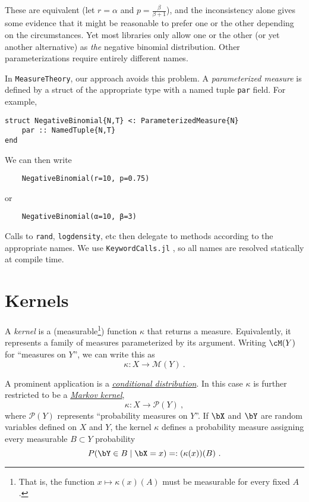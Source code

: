 \documentclass{juliacon}
\begin{document}
These are equivalent (let $r = \alpha$ and $p = \frac{\beta}{\beta + 1}$), and the inconsistency alone gives some evidence that it might be reasonable to prefer one or the other depending on the circumstances. Yet most libraries only allow one or the other (or yet another alternative) as \emph{the} negative binomial distribution. Other parameterizations require entirely different names.

In \verb|MeasureTheory|, our approach avoids this problem. A \emph{parameterized measure} is defined by a struct of the appropriate type with a named tuple \verb|par| field. For example,

\begin{verbatim}
struct NegativeBinomial{N,T} <: ParameterizedMeasure{N}
    par :: NamedTuple{N,T}
end
\end{verbatim}

We can then write 
\begin{verbatim}
    NegativeBinomial(r=10, p=0.75)
\end{verbatim}
or
\begin{verbatim}
    NegativeBinomial(α=10, β=3)
\end{verbatim}

Calls to \verb|rand|, \verb|logdensity|, etc then delegate to methods according to the appropriate names. We use \verb|KeywordCalls.jl| \cite{KeywordCalls.jl}, so all names are resolved statically at compile time.

\section{Kernels}

A \emph{kernel} is a (measurable\footnote{That is, the function $x \mapsto \kappa(x)(A)$ must be measurable for every fixed $A$.}) function $\kappa$ that returns a measure. Equivalently, it represents a family of measures parameterized by its argument. Writing $\cM(Y)$ for ``measures on $Y$'', we can write this as
\[
\kappa\colon X \to \mathscr{M}(Y)\ .
\]

A prominent application is a \href{https://en.wikipedia.org/wiki/Conditional_probability_distribution}{\emph{conditional distribution}}. In this case $\kappa$ is further restricted to be a \href{https://en.wikipedia.org/wiki/Markov_kernel}{\emph{Markov kernel}}, 
\[
\kappa\colon X \to \mathscr{P}(Y)\ ,
\]
where $\mathscr{P}(Y)$ represents ``probability measures on $Y$''.
If $\bX$ and $\bY$ are random variables defined on $X$ and $Y$, the kernel $\kappa$ defines a probability measure assigning every measurable $B\subset Y$ probability
\[
P(\bY \in B \mid \bX = x) =: (\kappa(x))(B)\ .
\]
\end{document}
